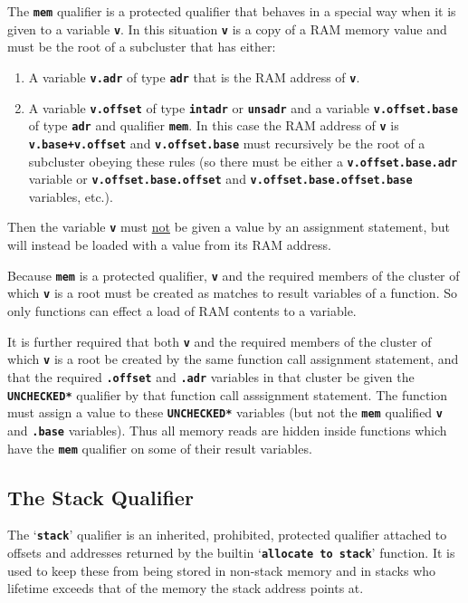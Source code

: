 \documentclass[12pt]{article}
\makeatletter
\newcommand{\TT}[1]{{\tt \bfseries #1}}
\newcommand{\ttkey}[1]{\TT{#1}\index{#1@{\tt #1}}}
\makeatother
\begin{document}
The \ttkey{mem} qualifier is a protected qualifier that behaves
in a special way when it is given to a variable \TT{v}.
In this situation \TT{v} is a copy of a RAM memory value and
must be the root of a subcluster that
has either:
\begin{enumerate}
\item
A variable \TT{v.adr} of type \TT{adr} that is the RAM address of \TT{v}.

\item
A variable \TT{v.offset} of type \TT{intadr} or \TT{unsadr} and
a variable \TT{v.offset.base} of type \TT{adr} and qualifier \TT{mem}.
In this case the RAM address of \TT{v} is \TT{v.base+v.offset} and
\TT{v.offset.base} must recursively be the root of a subcluster obeying
these rules (so there must be either a \TT{v.offset.base.adr} variable
or \TT{v.offset.base.offset} and \TT{v.offset.base.offset.base}
variables, etc.).
\end{enumerate}
Then the
variable \TT{v} must \underline{not} be given a value by an
assignment statement, but will instead be loaded with a value
from its RAM address.

Because \TT{mem} is a protected qualifier, \TT{v} and the required
members of the cluster of which \TT{v} is a root
must be created as matches to result variables of a function.
So only functions can effect a load of RAM contents to a variable.

It is further required that both \TT{v} and the required members of
the cluster of which \TT{v} is a root be created
by the same function call assignment statement, and that the required
\TT{.offset} and \TT{.adr} variables in that cluster
be given the \TT{*UNCHECKED*} qualifier by that function
call asssignment statement.
The function must assign a value to these \TT{*UNCHECKED*} variables
(but not the \TT{mem} qualified \TT{v} and \TT{.base} variables).
Thus all memory reads are hidden
inside functions which have the \TT{mem} qualifier on some of
their result variables.


\subsection{The Stack Qualifier}
\label{THE-STACK-QUALIFIER}

The `\ttkey{stack}' qualifier is an inherited, prohibited,
protected qualifier
attached to offsets and addresses
returned by the builtin `\TT{allocate to stack}'
function.  It is used to keep these from being stored in
non-stack memory and in stacks who lifetime exceeds that of the
memory the stack address points at.
\end{document}
